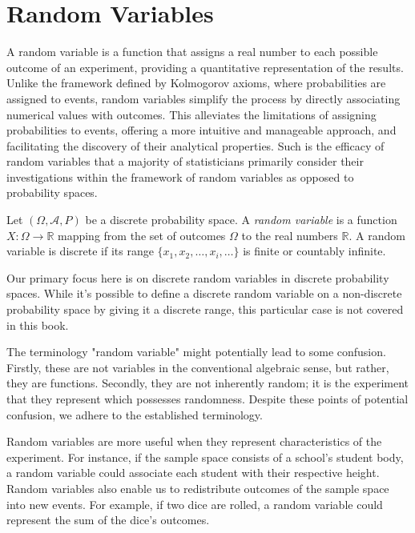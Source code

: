 %
%

\section{Random Variables}
\label{sec:probability_random_variables}

A random variable is a function that assigns a real number to each possible outcome of an experiment, providing a quantitative representation of the results. Unlike the framework defined by Kolmogorov axioms, where probabilities are assigned to events, random variables simplify the process by directly associating numerical values with outcomes. This alleviates the limitations of assigning probabilities to events, offering a more intuitive and manageable approach, and facilitating the discovery of their analytical properties. Such is the efficacy of random variables that a majority of statisticians primarily consider their investigations within the framework of random variables as opposed to probability spaces.

\begin{definition}
Let $\left( \Omega, \mathcal{A} , P \right)$ be a discrete probability space. A \emph{random variable} is a function $X : \Omega \rightarrow \mathbb{R}$ mapping from the set of outcomes $\Omega$ to the real numbers $\mathbb{R}$. A random variable is discrete  if its range $\{ x_1, x_2, \ldots, x_i, \ldots \}$ is finite or countably infinite.
\end{definition}

Our primary focus here is on discrete random variables in discrete probability spaces. While it's possible to define a discrete random variable on a non-discrete probability space by giving it a discrete range, this particular case is not covered in this book.

The terminology "random variable" might potentially lead to some confusion. Firstly, these are not variables in the conventional algebraic sense, but rather, they are functions. Secondly, they are not inherently random; it is the experiment that they represent which possesses randomness. Despite these points of potential confusion, we adhere to the established terminology.

Random variables are more useful when they represent characteristics of the experiment. For instance, if the sample space consists of a school's student body, a random variable could associate each student with their respective height. Random variables also enable us to redistribute outcomes of the sample space into new events. For example, if two dice are rolled, a random variable could represent the sum of the dice's outcomes.


